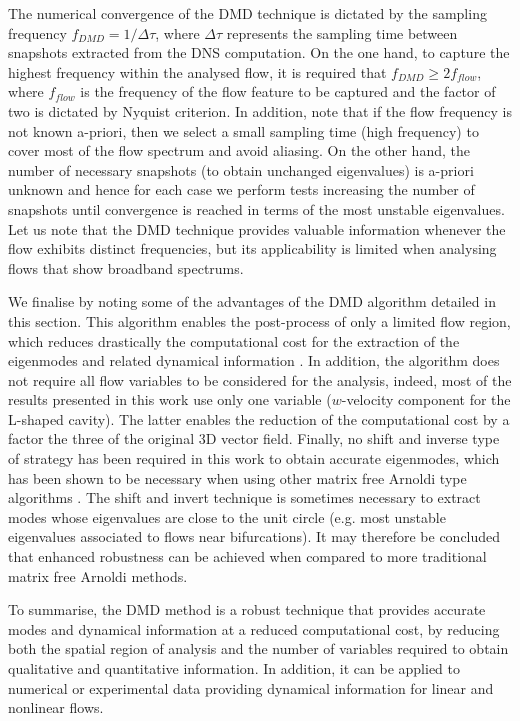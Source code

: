 \documentclass[a4paper,conference]{IEEEtran}
\begin{document}
The numerical convergence of the DMD technique is dictated by the sampling frequency $f_{DMD}=1/\Delta\tau$, where $\Delta\tau$ represents the sampling time between snapshots extracted from the DNS computation. On the one hand, to capture the highest frequency within the analysed flow, it is required that $f_{DMD}\geq2f_{flow}$, where $f_{flow}$ is the frequency of the flow feature to be captured and the factor of two is dictated by Nyquist criterion. In addition, note that if the flow frequency is not known a-priori, then we select a small sampling time (high frequency) to cover most of the flow spectrum and avoid aliasing. On the other hand, the number of necessary snapshots (to obtain unchanged eigenvalues) is a-priori unknown and hence for each case we perform tests increasing the number of snapshots until convergence is reached in terms of the most unstable eigenvalues.
Let us note that the DMD technique provides valuable information whenever the flow exhibits distinct frequencies, but its applicability is limited when analysing flows that show broadband spectrums.


We finalise by noting some of the advantages of the DMD algorithm detailed in this section.
This algorithm enables the post-process of only a limited flow region, which reduces drastically the computational cost for the extraction of the eigenmodes and related dynamical information \cite{DMDSchmid}. In addition, the algorithm does not require all flow variables to be considered for the analysis, indeed, most of the results presented in this work use only one variable ($w$-velocity component for the L-shaped cavity). The latter enables the reduction of the computational cost by a factor the three of the original 3D vector field. Finally, no shift and inverse type of strategy has been required in this work to obtain accurate eigenmodes, which has been shown to be necessary when using other matrix free Arnoldi type algorithms \cite{Vassilios_annual,Bagheri117430}. The shift and invert technique is sometimes necessary to extract modes whose eigenvalues are close to the unit circle (e.g. most unstable eigenvalues associated to flows near bifurcations).
It may therefore be concluded that enhanced robustness can be achieved when compared to more traditional matrix free Arnoldi methods.

To summarise, the DMD method is a robust technique that provides accurate modes and dynamical information at a reduced computational cost, by reducing both the spatial region of analysis and the number of variables required to obtain qualitative and quantitative information. In addition, it can be applied to numerical or experimental data providing dynamical information for linear and nonlinear flows.
\end{document}
